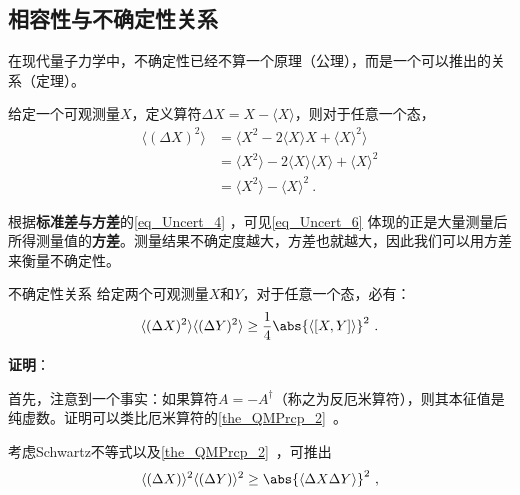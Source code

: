 


\subsection{相容性与不确定性关系}

在现代量子力学中，不确定性已经不算一个原理（公理），而是一个可以推出的关系（定理）。

给定一个可观测量$X$，定义算符$\Delta X=X-\langle X \rangle$，则对于任意一个态，
\begin{equation}\label{eq_Uncert_6}
\begin{aligned}
\langle (\Delta X)^2 \rangle &= \langle X^2-2\langle X \rangle X + \langle X \rangle^2 \rangle\\
&=\langle X^2\rangle -2\langle X \rangle \langle X \rangle + \langle X \rangle^2\\
&=\langle X^2 \rangle - \langle X \rangle^2~.
\end{aligned}
\end{equation}

根据\textbf{标准差与方差}的\autoref{eq_Uncert_4} ，可见\autoref{eq_Uncert_6} 体现的正是大量测量后所得测量值的\textbf{方差}。测量结果不确定度越大，方差也就越大，因此我们可以用方差来衡量不确定性。

\begin{theorem}{不确定性关系}\label{the_Uncert_1}
给定两个可观测量$X$和$Y$，对于任意一个态，必有：
\begin{equation}\label{eq_Uncert_9}
\langle (\Delta X)^2 \rangle\langle (\Delta Y)^2 \rangle \geq \frac{1}{4}\abs{\langle [X, Y] \rangle}^2~.
\end{equation}
\end{theorem}


\textbf{证明}：

首先，注意到一个事实：如果算符$A=-A^\dagger$（称之为反厄米算符），则其本征值是纯虚数。证明可以类比厄米算符的\autoref{the_QMPrcp_2}~。

考虑Schwartz不等式以及\autoref{the_QMPrcp_2}~，可推出
\begin{equation}\label{eq_Uncert_7}
\langle (\Delta X)\rangle^2\langle (\Delta Y)\rangle^2\geq \abs{\langle \Delta X \Delta Y \rangle}^2~,
\end{equation}

